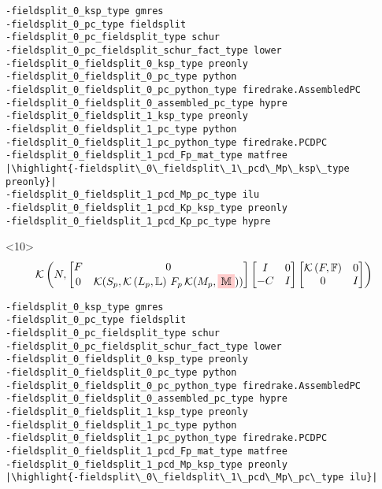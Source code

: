 \documentclass[presentation]{beamer}
\newcommand{\KSP}[2]{\ensuremath{\mathcal{K}\left(#1, \mathbb{#2}\right)}}
\newcommand{\ksp}[1]{\KSP{#1}{#1}}
\newcommand{\highlight}[1]{\colorbox{red!20}{\color{black} #1}}
\begin{document}
\begin{frame}[fragile]
\begin{onlyenv}
\begin{equation*}
    \end{equation*}
\begin{verbatim}
-fieldsplit_0_ksp_type gmres
-fieldsplit_0_pc_type fieldsplit
-fieldsplit_0_pc_fieldsplit_type schur
-fieldsplit_0_pc_fieldsplit_schur_fact_type lower
-fieldsplit_0_fieldsplit_0_ksp_type preonly
-fieldsplit_0_fieldsplit_0_pc_type python
-fieldsplit_0_fieldsplit_0_pc_python_type firedrake.AssembledPC
-fieldsplit_0_fieldsplit_0_assembled_pc_type hypre
-fieldsplit_0_fieldsplit_1_ksp_type preonly
-fieldsplit_0_fieldsplit_1_pc_type python
-fieldsplit_0_fieldsplit_1_pc_python_type firedrake.PCDPC
-fieldsplit_0_fieldsplit_1_pcd_Fp_mat_type matfree
|\highlight{-fieldsplit\_0\_fieldsplit\_1\_pcd\_Mp\_ksp\_type preonly}|
-fieldsplit_0_fieldsplit_1_pcd_Mp_pc_type ilu
-fieldsplit_0_fieldsplit_1_pcd_Kp_ksp_type preonly
-fieldsplit_0_fieldsplit_1_pcd_Kp_pc_type hypre
\end{verbatim}
  \end{onlyenv}
  \begin{onlyenv}<10>
    \color{gray}
    \begin{equation*}
      \KSP{N}{%
        \begin{bmatrix}
        F & 0 \\
        0 & \mathcal{K}(S_p, \KSP{L_p}{L}\,F_p \, \mathcal{K}(M_p, \highlight{$\mathbb{M}$}))
      \end{bmatrix}
      \begin{bmatrix}
        I & 0\\
        -C & I
      \end{bmatrix}
      \begin{bmatrix}
        \ksp{F} & 0 \\
        0 & I
      \end{bmatrix}}
    \end{equation*}
\begin{verbatim}
-fieldsplit_0_ksp_type gmres
-fieldsplit_0_pc_type fieldsplit
-fieldsplit_0_pc_fieldsplit_type schur
-fieldsplit_0_pc_fieldsplit_schur_fact_type lower
-fieldsplit_0_fieldsplit_0_ksp_type preonly
-fieldsplit_0_fieldsplit_0_pc_type python
-fieldsplit_0_fieldsplit_0_pc_python_type firedrake.AssembledPC
-fieldsplit_0_fieldsplit_0_assembled_pc_type hypre
-fieldsplit_0_fieldsplit_1_ksp_type preonly
-fieldsplit_0_fieldsplit_1_pc_type python
-fieldsplit_0_fieldsplit_1_pc_python_type firedrake.PCDPC
-fieldsplit_0_fieldsplit_1_pcd_Fp_mat_type matfree
-fieldsplit_0_fieldsplit_1_pcd_Mp_ksp_type preonly
|\highlight{-fieldsplit\_0\_fieldsplit\_1\_pcd\_Mp\_pc\_type ilu}|

\end{verbatim}
\end{onlyenv}
\end{frame}
\end{document}
